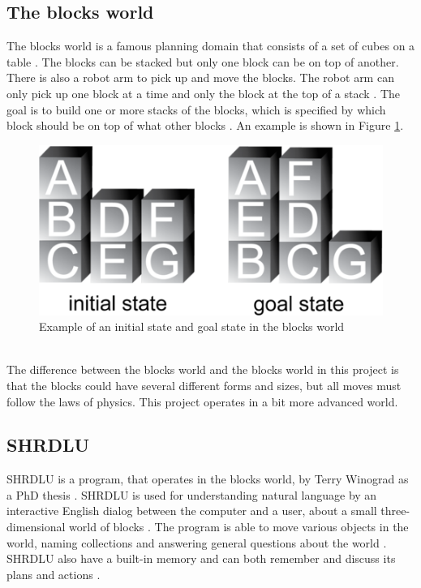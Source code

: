 \subsection{The blocks world}
The blocks world is a famous planning domain that consists of a set of cubes on
a table \citep{blocksworld_ai}. The blocks can be stacked but only one block
can be on top of another. There is also a robot arm to pick up and move the
blocks. The robot arm can only pick up one block at a time and only the block
at the top of a stack \citep{blocksworld_ai}. The goal is to build one or more
stacks of the blocks, which is specified by which block should be on top of
what other blocks \citep{blocksworld_ai}. An example is shown in Figure
\ref{fig:blocksworld}.
\begin{figure}[h!]
\centering
\includegraphics[scale = 0.4]{fig/blocksworld.png}
\caption{Example of an initial state and goal state in the blocks world \citep{blocksworld_fig}}
\label{fig:blocksworld}
\end{figure}\\
The difference between the blocks world and the blocks world in this project is that the blocks
could have several different forms and sizes, but all moves must follow the
laws of physics. This project operates in a bit more advanced world. 

\subsection{SHRDLU}
SHRDLU is a program, that operates in the blocks world, by Terry Winograd as a
PhD thesis \citep{SHRDLU_url}. SHRDLU is used for understanding natural
language by an interactive English dialog between the computer and a user,
about a small three-dimensional world of blocks \citep{SHRDLU_url}. The program
is able to move various objects in the world, naming collections and answering
general questions about the world \citep{SHRDLU_url2}. SHRDLU also have a
built-in memory and can both remember and discuss its plans and actions
\citep{SHRDLU_url2}.

